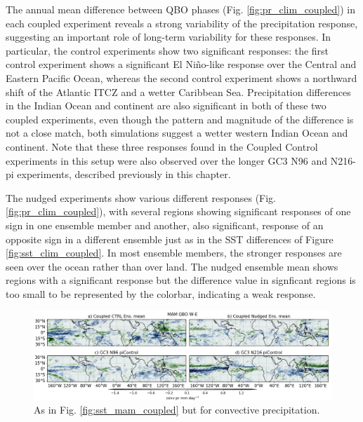 The annual mean difference between QBO phases (Fig. \ref{fig:pr_clim_coupled}) in each coupled experiment reveals a strong variability of the precipitation response, suggesting an important role of long-term variability for these responses. 
In particular, the control experiments show two significant responses: the first control experiment shows a significant El Niño-like response over the Central and Eastern Pacific Ocean, whereas the second control experiment shows a northward shift of the Atlantic ITCZ and a wetter Caribbean Sea.
Precipitation differences in the Indian Ocean and continent are also significant in both of these two coupled experiments, even though the pattern and magnitude of the difference is not a close match, both simulations suggest a wetter western Indian Ocean and continent. 
Note that these three responses found in the Coupled Control experiments in this setup were also observed over the longer GC3 N96 and N216-pi experiments, described previously in this chapter.



The nudged experiments show various different responses (Fig. \ref{fig:pr_clim_coupled}), with several regions showing significant responses of one sign in one ensemble member and another, also significant, response of an opposite sign in a different ensemble just as in the SST differences of Figure \ref{fig:sst_clim_coupled}. In most ensemble members, the stronger responses are seen over the ocean rather than over land.
The nudged ensemble mean shows regions with a significant response but the difference value in signficant regions is too small to be represented by the colorbar, indicating a weak response. 

\begin{figure}[t!]
\centering
 \includegraphics[width=\linewidth]{figures/conv_prseasonal_mamqbowqboe.png}
\caption[ Convective precipitation response in MAM]{As in Fig. \ref{fig:sst_mam_coupled} but for convective precipitation.}
\label{fig:conv_pr_mam_coupled}
\end{figure}



